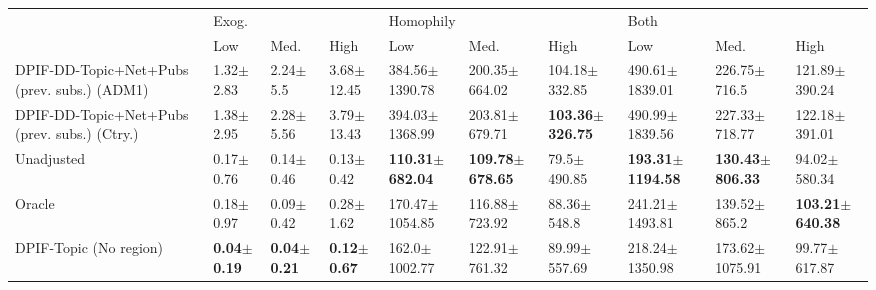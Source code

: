\begin{tabular}{llllllllll}
\toprule
{} & \multicolumn{3}{l}{Exog.} & \multicolumn{3}{l}{Homophily} & \multicolumn{3}{l}{Both} \\
{} &                     Low &                    Med. &                    High &                         Low &                        Med. &                        High &                          Low &                        Med. &                        High \\
\midrule
DPIF-DD-Topic+Net+Pubs (prev. subs.) (ADM1)  &           1.32$\pm$2.83 &            2.24$\pm$5.5 &          3.68$\pm$12.45 &          384.56$\pm$1390.78 &           200.35$\pm$664.02 &           104.18$\pm$332.85 &           490.61$\pm$1839.01 &            226.75$\pm$716.5 &           121.89$\pm$390.24 \\
DPIF-DD-Topic+Net+Pubs (prev. subs.) (Ctry.) &           1.38$\pm$2.95 &           2.28$\pm$5.56 &          3.79$\pm$13.43 &          394.03$\pm$1368.99 &           203.81$\pm$679.71 &  \textbf{103.36$\pm$326.75} &           490.99$\pm$1839.56 &           227.33$\pm$718.77 &           122.18$\pm$391.01 \\
Unadjusted                                   &           0.17$\pm$0.76 &           0.14$\pm$0.46 &           0.13$\pm$0.42 &  \textbf{110.31$\pm$682.04} &  \textbf{109.78$\pm$678.65} &             79.5$\pm$490.85 &  \textbf{193.31$\pm$1194.58} &  \textbf{130.43$\pm$806.33} &            94.02$\pm$580.34 \\
Oracle                                       &           0.18$\pm$0.97 &           0.09$\pm$0.42 &           0.28$\pm$1.62 &          170.47$\pm$1054.85 &           116.88$\pm$723.92 &             88.36$\pm$548.8 &           241.21$\pm$1493.81 &            139.52$\pm$865.2 &  \textbf{103.21$\pm$640.38} \\
DPIF-Topic (No region)                       &  \textbf{0.04$\pm$0.19} &  \textbf{0.04$\pm$0.21} &  \textbf{0.12$\pm$0.67} &           162.0$\pm$1002.77 &           122.91$\pm$761.32 &            89.99$\pm$557.69 &           218.24$\pm$1350.98 &          173.62$\pm$1075.91 &            99.77$\pm$617.87 \\
\bottomrule
\end{tabular}
